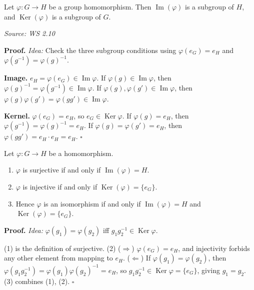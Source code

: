 \documentclass[11pt]{report}
\renewenvironment{proof}[1][Proof]{\noindent\textbf{#1.} }{\hfill$\square$\par\vspace{5pt}}
\newcommand{\srcline}[1]{\par\hfill{\footnotesize\textit{Source: #1}}}
\begin{document}
\begin{propbox}\label{prop:image-kernel-subgroups}
Let $\varphi: G \to H$ be a group homomorphism. Then $\operatorname{Im}(\varphi)$ is a subgroup of $H$, and $\operatorname{Ker}(\varphi)$ is a subgroup of $G$.
\srcline{WS 2.10}
\end{propbox}

\begin{proof}
\textit{Idea:} Check the three subgroup conditions using $\varphi(e_G) = e_H$ and $\varphi(g^{-1}) = \varphi(g)^{-1}$.\par
\textbf{Image.} $e_H = \varphi(e_G) \in \operatorname{Im}\varphi$. If $\varphi(g) \in \operatorname{Im}\varphi$, then $\varphi(g)^{-1} = \varphi(g^{-1}) \in \operatorname{Im}\varphi$. If $\varphi(g), \varphi(g') \in \operatorname{Im}\varphi$, then $\varphi(g)\varphi(g') = \varphi(gg') \in \operatorname{Im}\varphi$.

\textbf{Kernel.} $\varphi(e_G) = e_H$, so $e_G \in \operatorname{Ker}\varphi$. If $\varphi(g) = e_H$, then $\varphi(g^{-1}) = \varphi(g)^{-1} = e_H$. If $\varphi(g) = \varphi(g') = e_H$, then $\varphi(gg') = e_H \cdot e_H = e_H$.
\end{proof}

\begin{propbox}\label{prop:surjectivity-injectivity-via-image-kernel}
Let $\varphi: G \to H$ be a homomorphism.
\begin{enumerate}
    \item $\varphi$ is surjective if and only if $\operatorname{Im}(\varphi) = H$.
    \item $\varphi$ is injective if and only if $\operatorname{Ker}(\varphi) = \{e_G\}$.
    \item Hence $\varphi$ is an isomorphism if and only if $\operatorname{Im}(\varphi) = H$ and $\operatorname{Ker}(\varphi) = \{e_G\}$.
\end{enumerate}
\end{propbox}

\begin{proof}
\textit{Idea:} $\varphi(g_1) = \varphi(g_2)$ iff $g_1 g_2^{-1} \in \operatorname{Ker}\varphi$.\par
(1) is the definition of surjective. (2) ($\Rightarrow$) $\varphi(e_G) = e_H$, and injectivity forbids any other element from mapping to $e_H$. ($\Leftarrow$) If $\varphi(g_1) = \varphi(g_2)$, then $\varphi(g_1 g_2^{-1}) = \varphi(g_1)\varphi(g_2)^{-1} = e_H$, so $g_1 g_2^{-1} \in \operatorname{Ker}\varphi = \{e_G\}$, giving $g_1 = g_2$. (3) combines (1), (2).
\end{proof}
\end{document}
